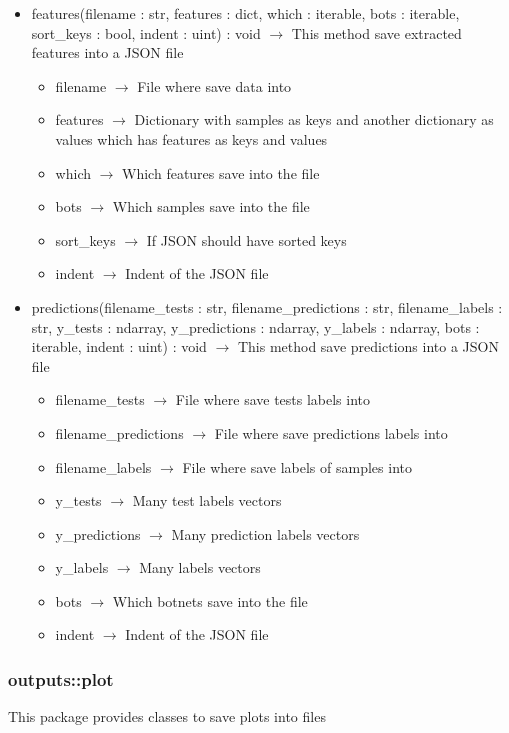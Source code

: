 \begin{description}
\begin{itemize}
\item features(filename : str, features : dict, which : iterable, bots : iterable, sort\_keys : bool, indent : uint) : void $\rightarrow$ This method save extracted features into a JSON file\begin{itemize}
\item filename $\rightarrow$ File where save data into
\item features $\rightarrow$ Dictionary with samples as keys and another dictionary as values which has features as keys and values
\item which $\rightarrow$ Which features save into the file
\item bots $\rightarrow$ Which samples save into the file
\item sort\_keys $\rightarrow$ If JSON should have sorted keys
\item indent $\rightarrow$ Indent of the JSON file
\end{itemize}

\item predictions(filename\_tests : str, filename\_predictions : str, filename\_labels : str, y\_tests : ndarray, y\_predictions : ndarray, y\_labels : ndarray, bots : iterable, indent : uint) : void $\rightarrow$ This method save predictions into a JSON file\begin{itemize}
\item filename\_tests $\rightarrow$ File where save tests labels into
\item filename\_predictions $\rightarrow$ File where save predictions labels into
\item filename\_labels $\rightarrow$ File where save labels of samples into
\item y\_tests $\rightarrow$ Many test labels vectors
\item y\_predictions $\rightarrow$ Many prediction labels vectors
\item y\_labels $\rightarrow$ Many labels vectors
\item bots $\rightarrow$ Which botnets save into the file
\item indent $\rightarrow$ Indent of the JSON file
\end{itemize}

\end{itemize}

\end{description}
\subsubsection{outputs::plot}
This package provides classes to save plots into files

